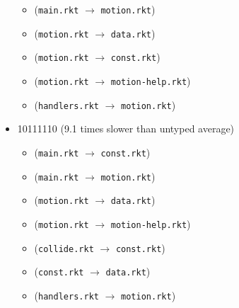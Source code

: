 \documentclass{article}
\newcommand{\mono}[1]{\texttt{#1}}
\begin{document}
\begin{itemize}
\begin{itemize}
  \item (\mono{main.rkt} $\rightarrow$ \mono{motion.rkt})
  \item (\mono{motion.rkt} $\rightarrow$ \mono{data.rkt})
  \item (\mono{motion.rkt} $\rightarrow$ \mono{const.rkt})
  \item (\mono{motion.rkt} $\rightarrow$ \mono{motion-help.rkt})
  \item (\mono{handlers.rkt} $\rightarrow$ \mono{motion.rkt})
  \end{itemize}
\item 10111110 (9.1 times slower than untyped average)
  \begin{itemize}
  \item (\mono{main.rkt} $\rightarrow$ \mono{const.rkt})
  \item (\mono{main.rkt} $\rightarrow$ \mono{motion.rkt})
  \item (\mono{motion.rkt} $\rightarrow$ \mono{data.rkt})
  \item (\mono{motion.rkt} $\rightarrow$ \mono{motion-help.rkt})
  \item (\mono{collide.rkt} $\rightarrow$ \mono{const.rkt})
  \item (\mono{const.rkt} $\rightarrow$ \mono{data.rkt})
  \item (\mono{handlers.rkt} $\rightarrow$ \mono{motion.rkt})
  \end{itemize}


\end{itemize}
\end{document}
